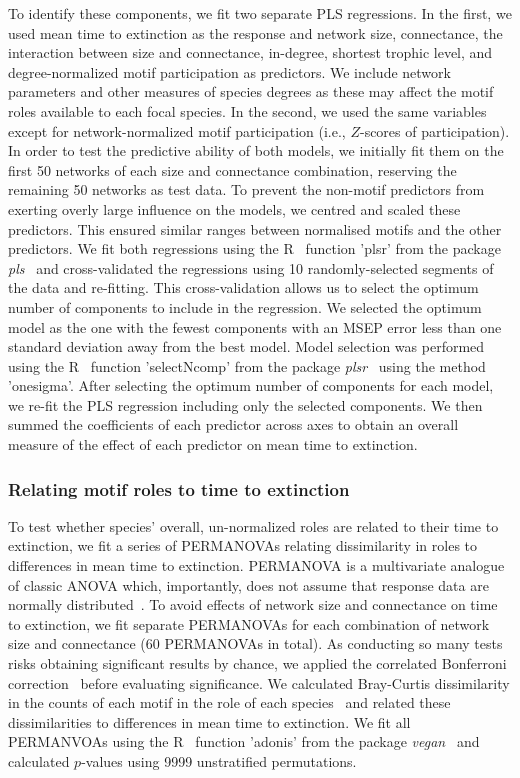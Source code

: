 \documentclass[12pt]{article}
\begin{document}
			To identify these components, we fit two separate PLS regressions.
			In the first, we used mean time to extinction as the response and network size, connectance, the interaction between size and connectance, in-degree, shortest trophic level, and degree-normalized motif participation as predictors.
			We include network parameters and other measures of species degrees as these may affect the motif roles available to each focal species.
			In the second, we used the same variables except for network-normalized motif participation (i.e., $Z$-scores of participation).  
			In order to test the predictive ability of both models, we initially fit them on the first 50 networks of each size and connectance combination, reserving the remaining 50 networks as test data.
			To prevent the non-motif predictors from exerting overly large influence on the models, we centred and scaled these predictors. 
			This ensured similar ranges between normalised motifs and the other predictors.
			We fit both regressions using the R~\citep{R} function 'plsr' from the package \emph{pls}~\citep{pls} and cross-validated the regressions using 10 randomly-selected segments of the data and re-fitting.
			This cross-validation allows us to select the optimum number of components to include in the regression.
			We selected the optimum model as the one with the fewest components with an MSEP error less than one standard deviation away from the best model.
			Model selection was performed using the R~\citep{R} function 'selectNcomp' from the package \emph{plsr}~\citep{pls} using the method 'onesigma'.
			After selecting the optimum number of components for each model, we re-fit the PLS regression including only the selected components. 
			We then summed the coefficients of each predictor across axes to obtain an overall measure of the effect of each predictor on mean time to extinction.


		\subsubsection*{Relating motif roles to time to extinction}

			To test whether species' overall, un-normalized roles are related to their time to extinction, we fit a series of PERMANOVAs relating dissimilarity in roles to differences in mean time to extinction.
			PERMANOVA is a multivariate analogue of classic ANOVA which, importantly, does not assume that response data are normally distributed~\citep{Anderson2001}.
			To avoid effects of network size and connectance on time to extinction, we fit separate PERMANOVAs for each combination of network size and connectance (60 PERMANOVAs in total).
			As conducting so many tests risks obtaining significant results by chance, we applied the correlated Bonferroni correction~\citep{Drezner2016} before evaluating significance.
			We calculated Bray-Curtis dissimilarity in the counts of each motif in the role of each species~\citep{Baker2015,Cirtwill2015} and related these dissimilarities to differences in mean time to extinction.
			We fit all PERMANVOAs using the R~\citep{R} function 'adonis' from the package \emph{vegan}~\citep{vegan} and calculated $p$-values using 9999 unstratified permutations.
\end{document}
